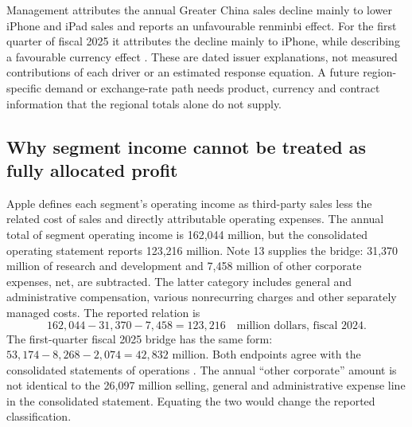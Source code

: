 Management attributes the annual Greater China sales decline mainly to lower
iPhone and iPad sales and reports an unfavourable renminbi effect. For the
first quarter of fiscal 2025 it attributes the decline mainly to iPhone,
while describing a favourable currency effect
\citep[annual and interim segment operating performance]{apple2024,apple2025q1}.
These are dated issuer explanations, not measured contributions of each driver
or an estimated response equation. A future region-specific demand or
exchange-rate path needs product, currency and contract information that the
regional totals alone do not supply.

\subsection{Why segment income cannot be treated as fully allocated profit}

Apple defines each segment's operating income as third-party sales less the
related cost of sales and directly attributable operating expenses. The
annual total of segment operating income is 162,044 million, but the
consolidated operating statement reports 123,216 million. Note 13 supplies
the bridge: 31,370 million of research and development and 7,458 million of
other corporate expenses, net, are subtracted. The latter category includes
general and administrative compensation, various nonrecurring charges and
other separately managed costs. The reported relation is
\begin{equation}
162{,}044-31{,}370-7{,}458=123{,}216
\quad\text{million dollars, fiscal 2024}.
\label{eq:apple-segment-income-bridge}
\end{equation}
The first-quarter fiscal 2025 bridge has the same form:
$53{,}174-8{,}268-2{,}074=42{,}832$ million. Both endpoints agree with the
consolidated statements of operations
\citep[statements of operations and Note 13, printed pp.~29 and 47]{apple2024}
\citep[statement of operations and Note 10, printed pp.~1 and 11]{apple2025q1}.
The annual ``other corporate'' amount is not identical to the 26,097 million
selling, general and administrative expense line in the consolidated
statement. Equating the two would change the reported classification.

